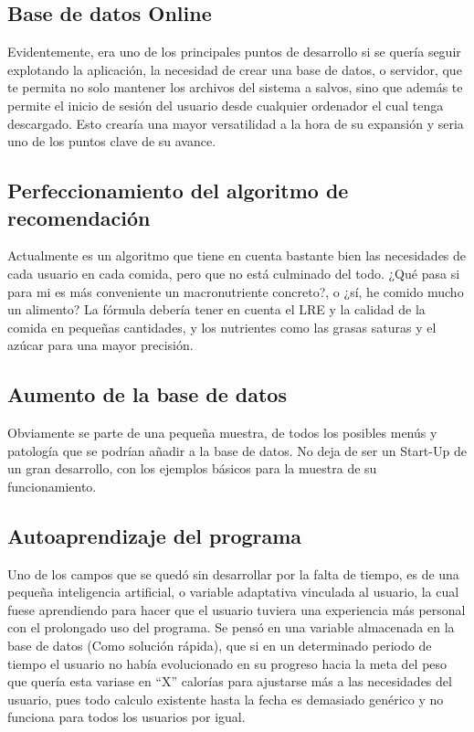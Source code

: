 \subsection{Base de datos Online}
Evidentemente, era uno de los principales puntos de desarrollo si se quería seguir explotando la aplicación, la necesidad de crear una base de datos, o servidor, que te permita no solo mantener los archivos del sistema a salvos, sino que además te permite el inicio de sesión del usuario desde cualquier ordenador el cual tenga descargado. Esto crearía una mayor versatilidad a la hora de su expansión y seria uno de los puntos clave de su avance.
\subsection{Perfeccionamiento del algoritmo de recomendación}
Actualmente es un algoritmo que tiene en cuenta bastante bien las necesidades de cada usuario en cada comida, pero que no está culminado del todo. ¿Qué pasa si para mi es más conveniente un macronutriente concreto?, o ¿sí, he comido mucho un alimento? La fórmula debería tener en cuenta el LRE y la calidad de la comida en pequeñas cantidades, y los nutrientes como las grasas saturas y el azúcar para una mayor precisión.
\subsection{Aumento de la base de datos}
Obviamente se parte de una pequeña muestra, de todos los posibles menús y patología que se podrían añadir a la base de datos. No deja de ser un Start-Up de un gran desarrollo, con los ejemplos básicos para la muestra de su funcionamiento.
\subsection{Autoaprendizaje del programa}
Uno de los campos que se quedó sin desarrollar por la falta de tiempo, es de una pequeña inteligencia artificial, o variable adaptativa vinculada al usuario, la cual fuese aprendiendo para hacer que el usuario tuviera una experiencia más personal con el prolongado uso del programa.
Se pensó en una variable almacenada en la base de datos (Como solución rápida), que si en un determinado periodo de tiempo el usuario no había evolucionado en su progreso hacia la meta del peso que quería esta variase en “X” calorías para ajustarse más a las necesidades del usuario, pues todo calculo existente hasta la fecha es demasiado genérico y no funciona para todos los usuarios por igual.


